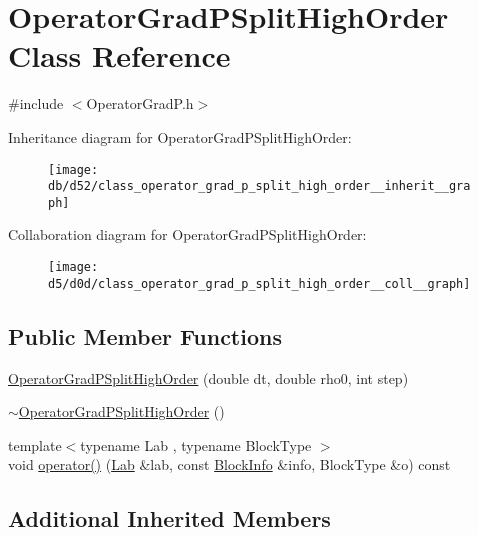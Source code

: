 \hypertarget{class_operator_grad_p_split_high_order}{}\section{Operator\+Grad\+P\+Split\+High\+Order Class Reference}
\label{class_operator_grad_p_split_high_order}


{\ttfamily \#include $<$Operator\+Grad\+P.\+h$>$}



Inheritance diagram for Operator\+Grad\+P\+Split\+High\+Order\+:\nopagebreak
\begin{figure}[H]
\begin{center}
\leavevmode
\texttt{[image: db/d52/class\_operator\_grad\_p\_split\_high\_order\_\_inherit\_\_graph]}
\end{center}
\end{figure}


Collaboration diagram for Operator\+Grad\+P\+Split\+High\+Order\+:\nopagebreak
\begin{figure}[H]
\begin{center}
\leavevmode
\texttt{[image: d5/d0d/class\_operator\_grad\_p\_split\_high\_order\_\_coll\_\_graph]}
\end{center}
\end{figure}
\subsection*{Public Member Functions}
\begin{DoxyCompactItemize}
\item 
\hyperlink{class_operator_grad_p_split_high_order_a618b48adbb0857d72df05bb4a960ef35}{Operator\+Grad\+P\+Split\+High\+Order} (double dt, double rho0, int step)
\item 
\hyperlink{class_operator_grad_p_split_high_order_a959a49282859f66d8f8b0edf192390ea}{$\sim$\+Operator\+Grad\+P\+Split\+High\+Order} ()
\item 
{\footnotesize template$<$typename Lab , typename Block\+Type $>$ }\\void \hyperlink{class_operator_grad_p_split_high_order_af1a9134e8ea512934a867636afc033b7}{operator()} (\hyperlink{_definitions_8h_ad6f951af9a2a6ebc1975404882b34314}{Lab} \&lab, const \hyperlink{struct_block_info}{Block\+Info} \&info, Block\+Type \&o) const 
\end{DoxyCompactItemize}
\subsection*{Additional Inherited Members}


